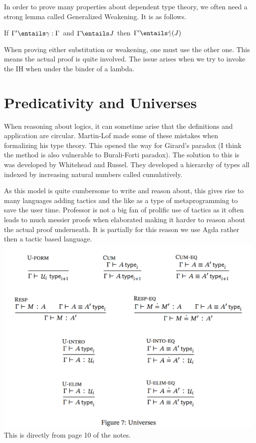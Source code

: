 \documentclass[11pt]{article}
\begin{document}
In order to prove many properties about dependent type theory, we often need a strong lemma called Generalized Weakening. It is as follows.

If $\Gamma' \entails \gamma : \Gamma$ and $\Gamma \entails J$ then $\Gamma' \entails \hat \gamma (J)$

When proving either substitution or weakening, one must use the other one. This means the actual proof is quite involved. The issue arises when we try to invoke the IH when under the binder of a lambda. 

\section*{Predicativity and Universes}
When reasoning about logics, it can sometime arise that the definitions and application are circular. Martin-Lof made some of these mistakes when formalizing his type theory. This opened the way for Girard's paradox (I think the method is also vulnerable to Burali-Forti paradox). The solution to this is was developed by Whitehead and Russel. They developed a hierarchy of types all indexed by increasing natural numbers called cumulatively.

As this model is quite cumbersome to write and reason about, this gives rise to many languages adding tactics and the like as a type of metaprogramming to save the user time. Professor is not a big fan of prolific use of tactics as it often leads to much messier proofs when elaborated making it harder to reason about the actual proof underneath. It is partially for this reason we use Agda rather then a tactic based language.
\includegraphics[width = \textwidth]{Universes.png}
This is directly from page 10 of the notes.
\end{document}

